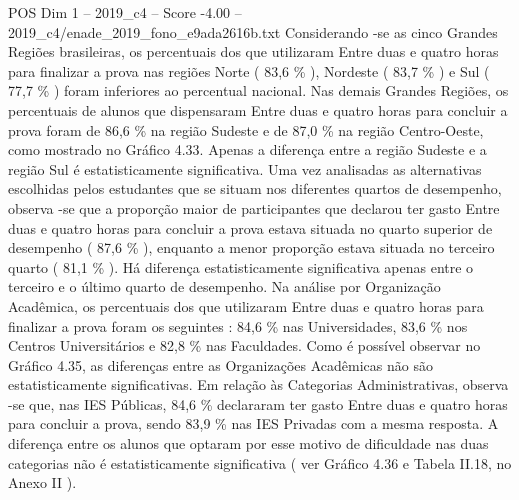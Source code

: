 \begin{textsample}{POS Dim 1 – 2019\_c4 – Score -4.00 – 2019\_c4/enade\_2019\_fono\_e9ada2616b.txt}
Considerando -se as cinco Grandes Regiões brasileiras, os percentuais dos que utilizaram Entre duas e quatro horas para finalizar a prova nas regiões Norte ( 83,6 \% ), Nordeste ( 83,7 \% ) e Sul ( 77,7 \% ) foram inferiores ao percentual nacional.
Nas demais Grandes Regiões, os percentuais de alunos que dispensaram Entre duas e quatro horas para concluir a prova foram de 86,6 \% na região Sudeste e de 87,0 \% na região Centro-Oeste, como mostrado no Gráfico 4.33.
Apenas a diferença entre a região Sudeste e a região Sul é estatisticamente significativa.
Uma vez analisadas as alternativas escolhidas pelos estudantes que se situam nos diferentes quartos de desempenho, observa -se que a proporção maior de participantes que declarou ter gasto Entre duas e quatro horas para concluir a prova estava situada no quarto superior de desempenho ( 87,6 \% ), enquanto a menor proporção estava situada no terceiro quarto ( 81,1 \% ).
Há diferença estatisticamente significativa apenas entre o terceiro e o último quarto de desempenho.
Na análise por Organização Acadêmica, os percentuais dos que utilizaram Entre duas e quatro horas para finalizar a prova foram os seguintes : 84,6 \% nas Universidades, 83,6 \% nos Centros Universitários e 82,8 \% nas Faculdades.
Como é possível observar no Gráfico 4.35, as diferenças entre as Organizações Acadêmicas não são estatisticamente significativas.
Em relação às Categorias Administrativas, observa -se que, nas IES Públicas, 84,6 \% declararam ter gasto Entre duas e quatro horas para concluir a prova, sendo 83,9 \% nas IES Privadas com a mesma resposta.
A diferença entre os alunos que optaram por esse motivo de dificuldade nas duas categorias não é estatisticamente significativa ( ver Gráfico 4.36 e Tabela II.18, no Anexo II ).

\end{textsample}
